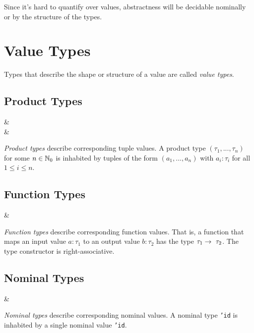 Since it's hard to quantify over values, abstractness will be decidable nominally or by the structure of the types.



\section{Value Types}

Types that describe the shape or structure of a value are called \textit{value types}.


\subsection{Product Types}

\begin{grammar}
 &\produce {} \\
 &\produce {}
\end{grammar}

\noindent \textit{Product types} describe corresponding tuple values. A product type $(\tau_1, ..., \tau_n)$ for some $n \in \mathbb{N}_0$ is inhabited by tuples of the form $(a_1, ..., a_n)$ with $a_i : \tau_i$ for all $1 \leq i \leq n$.


\subsection{Function Types}

\begin{grammar}
 &\produce {}
\end{grammar}

\noindent \textit{Function types} describe corresponding function values. That is, a function that maps an input value $a : \tau_1$ to an output value $b : \tau_2$ has the type $\tau_1 \fto \tau_2$. The type constructor is right-associative.


\subsection{Nominal Types}

\begin{grammar}
 &\produce {}
\end{grammar}

\noindent \textit{Nominal types} describe corresponding nominal values. A nominal type \texttt{'id} is inhabited by a single nominal value \texttt{'id}.



